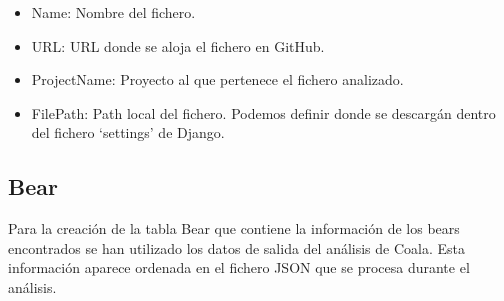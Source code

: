 \documentclass[a4paper, 12pt]{book}
\begin{document}
\begin{itemize}
          \item Name: Nombre del fichero.
          \item URL: URL donde se aloja el fichero en GitHub.
          \item ProjectName: Proyecto al que pertenece el fichero analizado.
          \item FilePath: Path local del fichero. Podemos definir donde se descargán dentro del fichero `settings' de Django.
\end{itemize}

\subsection{Bear}
\label{sec:seccion14.3}
Para la creación de la tabla Bear que contiene la información de los bears encontrados se han utilizado los datos de salida del análisis de Coala. Esta información aparece ordenada en el fichero JSON que se procesa durante el análisis.
\end{document}
